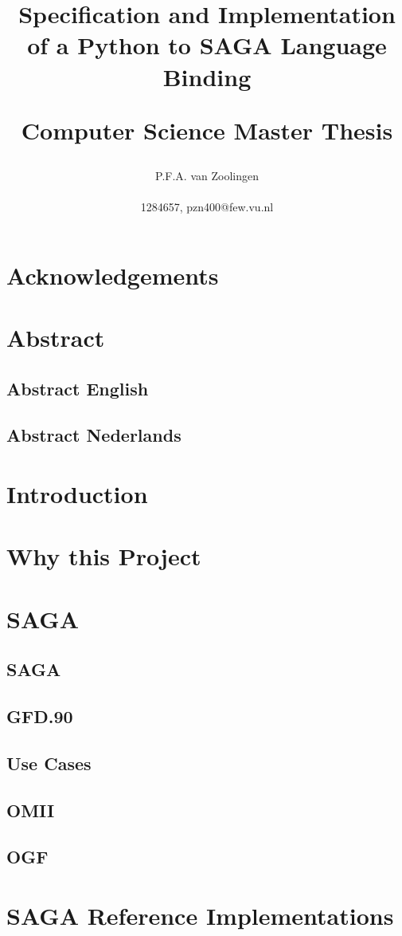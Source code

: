 \documentclass[a4paper,11pt,onecolumn,notitlepage]{report}
\author{
	P.F.A. van Zoolingen \\ 
	\begin{normalsize}
	1284657, pzn400@few.vu.nl
	\end{normalsize}
}
\title{
	\begin{center}
	Specification and Implementation of a Python to SAGA Language Binding \\
	\begin{normalsize}
	Computer Science Master Thesis
	\end{normalsize}
	\end{center}
}
\begin{document}
\maketitle
\section{Acknowledgements}
\section{Abstract}
\subsection{Abstract English}
\subsection{Abstract Nederlands}
\section{Introduction}
\section{Why this Project}


\section{SAGA}
\subsection{SAGA}
\subsection{GFD.90}
\subsection{Use Cases}
\subsection{OMII}
\subsection{OGF}
\pagebreak[0]

\section{SAGA Reference Implementations}
\end{document}
